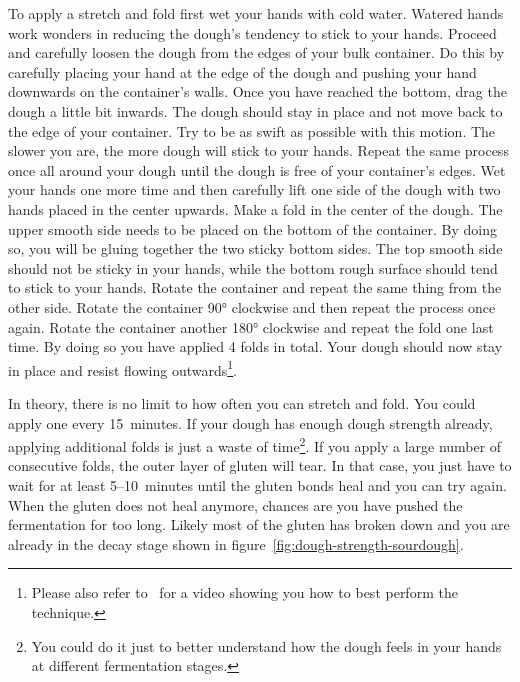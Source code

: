 To apply a stretch and fold first wet your hands with cold water. Watered hands
work wonders in reducing the dough's tendency to stick to your hands. Proceed and
carefully loosen the dough from the edges of your bulk container. Do this by
carefully placing your hand at the edge of the dough and pushing your hand
downwards on the container's walls. Once you have reached the bottom, drag the dough
a little bit inwards. The dough should stay in place and not move back to the
edge of your container. Try to be as swift as possible with this motion. The
slower you are, the more dough will stick to your hands. Repeat the same process
once all around your dough until the dough is free of your container's edges.
Wet your hands one more time and then carefully lift one side of the dough with
two hands placed in the center upwards. Make a fold in the center of the dough.
The upper smooth side needs to be placed on the bottom of the container. By doing
so, you will be gluing together the two sticky bottom sides. The top smooth side should
not be sticky in your hands, while the bottom rough surface should tend
to stick to your hands. Rotate the container
and repeat the same thing from the other side. Rotate the container 90°
clockwise and then repeat the process once again. Rotate the container another 180° clockwise
and repeat the fold one last time. By doing so you have applied 4 folds in total. Your
dough should now stay in place and resist flowing outwards\footnote{Please
also refer to~\cite{stretch+and+fold+technique} for a video showing you how to
best perform the technique.}.

In theory, there is no limit to how often you can stretch and fold. You could
apply one every 15~minutes. If your dough has enough dough strength already,
applying additional folds is just a waste of time\footnote{You could do it
just to better understand how the dough feels in your hands at different
fermentation stages.}. If you apply a large number of consecutive folds, the
outer layer of gluten
will tear. In that case, you just have to wait for at least 5--10~minutes until
the gluten bonds heal and you can try again. When the gluten does not heal
anymore, chances are you have pushed the fermentation for too long. Likely
most of the gluten has broken down and you are already
in the decay stage shown in figure~\ref{fig:dough-strength-sourdough}.

